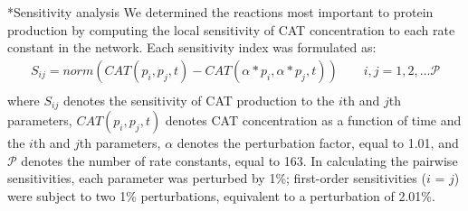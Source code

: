 \documentclass[12pt]{article}
\makeatletter
\renewcommand\subsection{\@startsection
	{subsection}{2}{0mm}
	{-0.05in}
	{-0.5\baselineskip}
	{\normalfont\normalsize\bfseries}}
\makeatother
\begin{document}
\subsection*{Sensitivity analysis}
We determined the reactions most important to protein production by computing the local sensitivity of CAT concentration to each rate constant in the network.
Each sensitivity index was formulated as:
\begin{equation}\label{eqn:local-sensitivity}
\begin{split}
    S_{ij}=norm(CAT(p_i,p_j,t)-CAT(\alpha*p_i,\alpha*p_j,t))\qquad{i,j=1,2,\hdots\mathcal{P}}\\
\end{split}
\end{equation}
where $S_{ij}$ denotes the sensitivity of CAT production to the $i$th and $j$th parameters, $CAT(p_i,p_j,t)$ denotes CAT concentration as a function of time and the $i$th and $j$th parameters, $\alpha$ denotes the perturbation factor, equal to 1.01, and $\mathcal{P}$ denotes the number of rate constants, equal to 163.
In calculating the pairwise sensitivities, each parameter was perturbed by 1\%; first-order sensitivities ($i$ = $j$) were subject to two 1\% perturbations, equivalent to a perturbation of 2.01\%.
\end{document}
